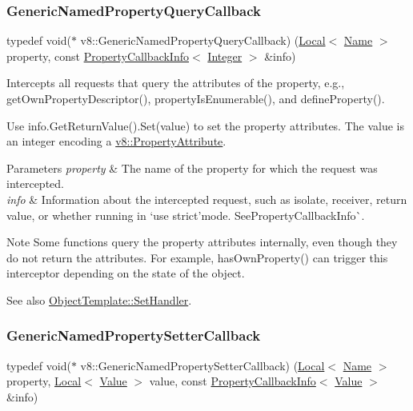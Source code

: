 \subsubsection{\texorpdfstring{Generic\+Named\+Property\+Query\+Callback}{GenericNamedPropertyQueryCallback}}
{\footnotesize\ttfamily typedef void($\ast$ v8\+::\+Generic\+Named\+Property\+Query\+Callback) (\mbox{\hyperlink{classv8_1_1Local}{Local}}$<$ \mbox{\hyperlink{classv8_1_1Name}{Name}} $>$ property, const \mbox{\hyperlink{classv8_1_1PropertyCallbackInfo}{Property\+Callback\+Info}}$<$ \mbox{\hyperlink{classv8_1_1Integer}{Integer}} $>$ \&info)}

Intercepts all requests that query the attributes of the property, e.\+g., get\+Own\+Property\+Descriptor(), property\+Is\+Enumerable(), and define\+Property().

Use {\ttfamily info.\+Get\+Return\+Value().Set(value)} to set the property attributes. The value is an integer encoding a {\ttfamily \mbox{\hyperlink{namespacev8_a05f25f935e108a1ea2d150e274602b87}{v8\+::\+Property\+Attribute}}}.


\begin{DoxyParams}{Parameters}
{\em property} & The name of the property for which the request was intercepted. \\
\hline
{\em info} & Information about the intercepted request, such as isolate, receiver, return value, or whether running in `\textquotesingle{}use strict'{\ttfamily mode. See}Property\+Callback\+Info\`{}.\\
\hline
\end{DoxyParams}
\begin{DoxyNote}{Note}
Some functions query the property attributes internally, even though they do not return the attributes. For example, {\ttfamily has\+Own\+Property()} can trigger this interceptor depending on the state of the object.
\end{DoxyNote}
See also {\ttfamily \mbox{\hyperlink{classv8_1_1ObjectTemplate_a3d5666f1e9b0f46df6b4dbb7cfbb6114}{Object\+Template\+::\+Set\+Handler}}.} \mbox{\label{namespacev8_af74716c6e95a269c6cd4314662fd0a7e}} 
\subsubsection{\texorpdfstring{Generic\+Named\+Property\+Setter\+Callback}{GenericNamedPropertySetterCallback}}
{\footnotesize\ttfamily typedef void($\ast$ v8\+::\+Generic\+Named\+Property\+Setter\+Callback) (\mbox{\hyperlink{classv8_1_1Local}{Local}}$<$ \mbox{\hyperlink{classv8_1_1Name}{Name}} $>$ property, \mbox{\hyperlink{classv8_1_1Local}{Local}}$<$ \mbox{\hyperlink{classv8_1_1Value}{Value}} $>$ value, const \mbox{\hyperlink{classv8_1_1PropertyCallbackInfo}{Property\+Callback\+Info}}$<$ \mbox{\hyperlink{classv8_1_1Value}{Value}} $>$ \&info)}

